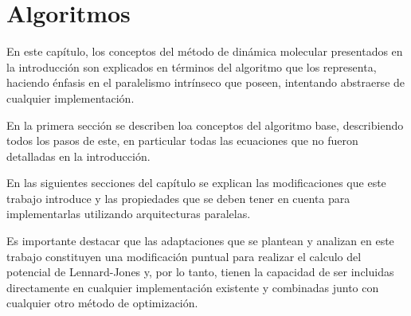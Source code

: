 
\chapter{Algoritmos}


En este capítulo, los conceptos del m\'etodo de dinámica molecular presentados en la introducción son explicados en términos del algoritmo que los representa,
haciendo énfasis en el paralelismo intrínseco que poseen, intentando abstraerse de cualquier implementación.

En la primera sección se describen loa conceptos del algoritmo base, describiendo todos los pasos de este, en particular todas las ecuaciones que no fueron detalladas en la introducción. 

En las siguientes secciones del capítulo se explican las modificaciones que este trabajo introduce y las propiedades que se deben tener en cuenta para implementarlas utilizando arquitecturas paralelas.

Es importante destacar que las adaptaciones que se plantean y analizan en este trabajo constituyen una modificación puntual para realizar el calculo del potencial de Lennard-Jones y, por lo tanto, 
tienen la capacidad de ser incluidas directamente en cualquier implementación existente y combinadas junto con cualquier otro método de optimización.






